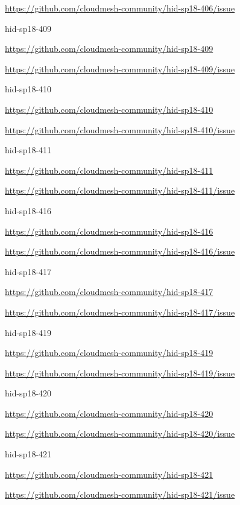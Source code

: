 \url{https://github.com/cloudmesh-community/hid-sp18-406/issue}


hid-sp18-409

\url{https://github.com/cloudmesh-community/hid-sp18-409}

\url{https://github.com/cloudmesh-community/hid-sp18-409/issue}


hid-sp18-410

\url{https://github.com/cloudmesh-community/hid-sp18-410}

\url{https://github.com/cloudmesh-community/hid-sp18-410/issue}


hid-sp18-411

\url{https://github.com/cloudmesh-community/hid-sp18-411}

\url{https://github.com/cloudmesh-community/hid-sp18-411/issue}


hid-sp18-416

\url{https://github.com/cloudmesh-community/hid-sp18-416}

\url{https://github.com/cloudmesh-community/hid-sp18-416/issue}


hid-sp18-417

\url{https://github.com/cloudmesh-community/hid-sp18-417}

\url{https://github.com/cloudmesh-community/hid-sp18-417/issue}


hid-sp18-419

\url{https://github.com/cloudmesh-community/hid-sp18-419}

\url{https://github.com/cloudmesh-community/hid-sp18-419/issue}


hid-sp18-420

\url{https://github.com/cloudmesh-community/hid-sp18-420}

\url{https://github.com/cloudmesh-community/hid-sp18-420/issue}


hid-sp18-421

\url{https://github.com/cloudmesh-community/hid-sp18-421}

\url{https://github.com/cloudmesh-community/hid-sp18-421/issue}


